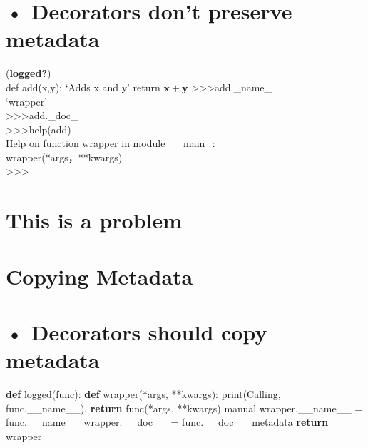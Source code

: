\documentclass[
  letterpaper,
  DIV=11,
  numbers=noendperiod]{scrreprt}
\newenvironment{Shaded}{\begin{snugshade}}{\end{snugshade}}
\newcommand{\BuiltInTok}[1]{\textcolor[rgb]{0.00,0.23,0.31}{#1}}
\newcommand{\ControlFlowTok}[1]{\textcolor[rgb]{0.00,0.23,0.31}{\textbf{#1}}}
\newcommand{\KeywordTok}[1]{\textcolor[rgb]{0.00,0.23,0.31}{\textbf{#1}}}
\newcommand{\NormalTok}[1]{\textcolor[rgb]{0.00,0.23,0.31}{#1}}
\newcommand{\OperatorTok}[1]{\textcolor[rgb]{0.37,0.37,0.37}{#1}}
\newcommand{\StringTok}[1]{\textcolor[rgb]{0.13,0.47,0.30}{#1}}
\newcommand{\VariableTok}[1]{\textcolor[rgb]{0.07,0.07,0.07}{#1}}
\begin{document}

\chapter{• Decorators don't preserve
metadata}\label{decorators-dont-preserve-metadata}

(\textbf{logged?})\\
def add(x,y): `Adds x and y' return \(\mathbf{x} + \mathbf{y}\)
\textgreater\textgreater\textgreater add.\_name\_\\
`wrapper'\\
\textgreater\textgreater\textgreater add.\_doc\_\\
\textgreater\textgreater\textgreater help(add)\\
Help on function wrapper in module \_\_main\_:\\
wrapper(*args，**kwargs)\\
\textgreater\textgreater\textgreater{}


\chapter{This is a problem}\label{this-is-a-problem}


\chapter{Copying Metadata}\label{copying-metadata}


\chapter{• Decorators should copy
metadata}\label{decorators-should-copy-metadata}

\begin{Shaded}
\begin{Highlighting}[]
\KeywordTok{def}\NormalTok{ logged(func):}
    \KeywordTok{def}\NormalTok{ wrapper(}\OperatorTok{*}\NormalTok{args, }\OperatorTok{**}\NormalTok{kwargs):}
        \BuiltInTok{print}\NormalTok{(}\StringTok{\textquotesingle{}Calling\textquotesingle{}}\NormalTok{, func.}\VariableTok{\_\_name\_\_}\NormalTok{).}
    \ControlFlowTok{return}\NormalTok{ func(}\OperatorTok{*}\NormalTok{args, }\OperatorTok{**}\NormalTok{kwargs)}
\NormalTok{manual wrapper.}\VariableTok{\_\_name\_\_} \OperatorTok{=}\NormalTok{ func.}\VariableTok{\_\_name\_\_}
\NormalTok{wrapper.\_\_doc\_\_ }\OperatorTok{=}\NormalTok{ func.\_\_doc\_\_}
\NormalTok{metadata }\ControlFlowTok{return}\NormalTok{ wrapper }
\end{Highlighting}
\end{Shaded}
\end{document}
